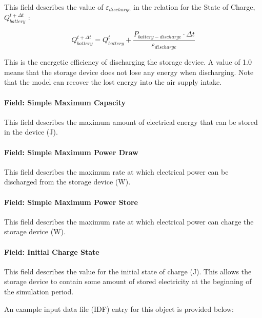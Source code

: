 This field describes the value of \({\varepsilon_{discharge}}\) in the relation for the State of Charge, \(Q_{battery}^{t + \Delta t}\) :

\begin{equation}
Q_{battery}^{t + \Delta t} = Q_{battery}^t + \frac{{{P_{battery - discharge}} \cdot \Delta t}}{{{\varepsilon_{discharge}}}}
\end{equation}

This is the energetic efficiency of discharging the storage device. A value of 1.0 means that the storage device does not lose any energy when discharging. Note that the model can recover the lost energy into the air supply intake.

\paragraph{Field: Simple Maximum Capacity}\label{field-simple-maximum-capacity}

This field describes the maximum amount of electrical energy that can be stored in the device (J).

\paragraph{Field: Simple Maximum Power Draw}\label{field-simple-maximum-power-draw}

This field describes the maximum rate at which electrical power can be discharged from the storage device (W).

\paragraph{Field: Simple Maximum Power Store}\label{field-simple-maximum-power-store}

This field describes the maximum rate at which electrical power can charge the storage device (W).

\paragraph{Field: Initial Charge State}\label{field-initial-charge-state}

This field describes the value for the initial state of charge (J). This allows the storage device to contain some amount of stored electricity at the beginning of the simulation period.

An example input data file (IDF) entry for this object is provided below:


